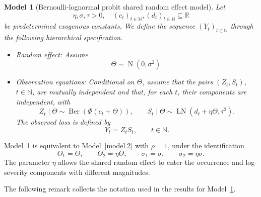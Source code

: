 \documentclass[11pt,authoryear]{elsarticle}
\def\Real{\mathbb{R}}
\newtheorem{model}{Model}
\theoremstyle{nopunct}
\numberwithin{equation}{section}
\begin{document}
\begin{model}[Bernoulli-lognormal probit shared random effect model]
\label{m.2.uni}
Let
\[
\eta,\sigma,\tau>0, \quad 
(c_t)_{t\in\mathbb N},(d_t)_{t\in\mathbb N}\subseteq\Real
\]
be predetermined exogenous constants.
We define the sequence \((Y_t)_{t\in\mathbb N}\)
through the following hierarchical specification.

\begin{itemize}
  \item[i.] Random effect:
  Assume
  \[
  \Theta\sim\operatorname{N}(0,\sigma^2).
  \]

  \item[ii.] Observation equations:
  Conditional on \(\Theta\), assume that the pairs
  \((Z_t,S_t)\), \(t\in\mathbb N\), are mutually independent
  and that, for each \(t\), their components are independent,
  with
  \[
  Z_t\mid\Theta
  \sim
  \operatorname{Ber}\left(\Phi(c_t+\Theta)\right),
  \qquad
  S_t\mid\Theta
  \sim
  \operatorname{LN}(d_t+\eta\Theta,\tau^2).
  \]
  The observed loss is defined by
  \[
  Y_t=Z_tS_t,
  \qquad t\in\mathbb N.
  \]
\end{itemize}
\end{model}

Model~\ref{m.2.uni} is equivalent to Model~\ref{model.2}
with \(\rho=1\), under the identification
\[
\Theta_1=\Theta,
\qquad
\Theta_2=\eta\Theta,
\qquad
\sigma_1=\sigma,
\qquad
\sigma_2=\eta\sigma.
\]
The parameter \(\eta\) allows the shared random effect
to enter the occurrence and log-severity components
with different magnitudes.



The following remark collects the notation used in the results for
Model~\ref{m.2.uni}.
\end{document}

